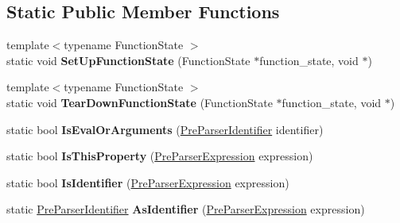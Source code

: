 \subsection*{Static Public Member Functions}
\begin{DoxyCompactItemize}
\item 
\hypertarget{classv8_1_1internal_1_1_pre_parser_traits_a1bc678c502f5b4c450cb7b3bf4f4fbac}{}{\footnotesize template$<$typename Function\+State $>$ }\\static void {\bfseries Set\+Up\+Function\+State} (Function\+State $\ast$function\+\_\+state, void $\ast$)\label{classv8_1_1internal_1_1_pre_parser_traits_a1bc678c502f5b4c450cb7b3bf4f4fbac}

\item 
\hypertarget{classv8_1_1internal_1_1_pre_parser_traits_af5539899cdf30bb1d764e9526bdbda86}{}{\footnotesize template$<$typename Function\+State $>$ }\\static void {\bfseries Tear\+Down\+Function\+State} (Function\+State $\ast$function\+\_\+state, void $\ast$)\label{classv8_1_1internal_1_1_pre_parser_traits_af5539899cdf30bb1d764e9526bdbda86}

\item 
\hypertarget{classv8_1_1internal_1_1_pre_parser_traits_aeb74a4d52c1bf930b7d3aa48a920bb25}{}static bool {\bfseries Is\+Eval\+Or\+Arguments} (\hyperlink{classv8_1_1internal_1_1_pre_parser_identifier}{Pre\+Parser\+Identifier} identifier)\label{classv8_1_1internal_1_1_pre_parser_traits_aeb74a4d52c1bf930b7d3aa48a920bb25}

\item 
\hypertarget{classv8_1_1internal_1_1_pre_parser_traits_a7fcbf5d8ec23c715e19eb730d5298882}{}static bool {\bfseries Is\+This\+Property} (\hyperlink{classv8_1_1internal_1_1_pre_parser_expression}{Pre\+Parser\+Expression} expression)\label{classv8_1_1internal_1_1_pre_parser_traits_a7fcbf5d8ec23c715e19eb730d5298882}

\item 
\hypertarget{classv8_1_1internal_1_1_pre_parser_traits_a964926f5f2fc4049a9a3eb00d343878b}{}static bool {\bfseries Is\+Identifier} (\hyperlink{classv8_1_1internal_1_1_pre_parser_expression}{Pre\+Parser\+Expression} expression)\label{classv8_1_1internal_1_1_pre_parser_traits_a964926f5f2fc4049a9a3eb00d343878b}

\item 
\hypertarget{classv8_1_1internal_1_1_pre_parser_traits_ac5cb7ce8a75ce068541136b20b68dcad}{}static \hyperlink{classv8_1_1internal_1_1_pre_parser_identifier}{Pre\+Parser\+Identifier} {\bfseries As\+Identifier} (\hyperlink{classv8_1_1internal_1_1_pre_parser_expression}{Pre\+Parser\+Expression} expression)\label{classv8_1_1internal_1_1_pre_parser_traits_ac5cb7ce8a75ce068541136b20b68dcad}


\end{DoxyCompactItemize}
